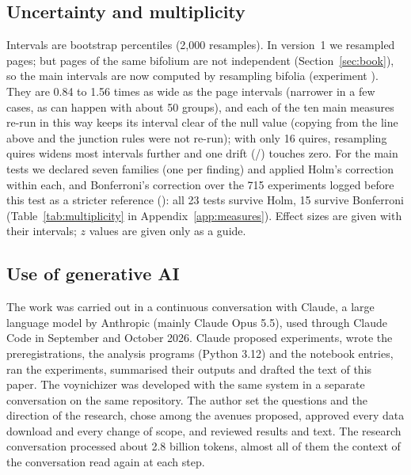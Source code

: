 \subsection{Uncertainty and multiplicity}

Intervals are bootstrap percentiles (2{,}000 resamples). In version~1 we resampled pages; but pages of the same
bifolium are not independent (Section~\ref{sec:book}), so the main intervals are now computed by resampling bifolia
(experiment ). They are 0.84 to 1.56 times as wide as the page intervals (narrower in a few cases, as can
happen with about 50 groups), and each of the ten main
measures re-run in this way keeps its interval clear of the null value (copying from the line above and the junction
rules were not re-run); with only 16 quires, resampling quires widens most intervals further and one drift
(/) touches zero. For the main tests we declared seven families (one per finding) and applied Holm's
correction within each, and Bonferroni's correction over the 715 experiments logged before this test as a stricter reference
(): all 23 tests survive Holm, 15 survive Bonferroni (Table~\ref{tab:multiplicity} in
Appendix~\ref{app:measures}). Effect sizes are given with their intervals; $z$ values are given only as a guide.

\subsection{Use of generative AI}

The work was carried out in a continuous conversation with Claude, a large language model by Anthropic (mainly
Claude Opus 5.5), used through Claude Code in September and October 2026. Claude proposed experiments, wrote the
preregistrations, the analysis programs (Python 3.12) and the notebook entries, ran the experiments, summarised their
outputs and drafted the text of this paper. The voynichizer was developed with the same system in a separate
conversation on the same repository. The author set the questions and the direction of the research, chose among the
avenues proposed, approved every data download and every change of scope, and reviewed results and text. The research
conversation processed about 2.8 billion tokens, almost all of them the context of the conversation read again at each
step.
